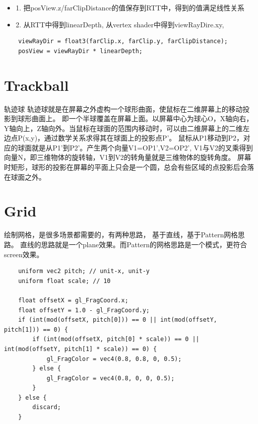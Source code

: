 \begin{itemize}
    \item {1. 把posView.z/farClipDistance的值保存到RTT中，得到的值满足线性关系}
    \item {2. 从RTT中得到linearDepth, 从vertex shader中得到viewRayDire.xy, }
\end{itemize}

\begin{lstlisting}
    viewRayDir = float3(farClip.x, farClip.y, farClipDistance);
    posView = viewRayDir * linearDepth;
\end{lstlisting}

\section{Trackball}
轨迹球\cite{Trackball}
轨迹球就是在屏幕之外虚构一个球形曲面，使鼠标在二维屏幕上的移动投影到球形曲面上。
即一个半球覆盖在屏幕上面。以屏幕中心为球心O，X轴向右，Y轴向上，Z轴向外。当鼠标在球面的范围内移动时，可以由二维屏幕上的二维左边点P(x,y)，通过数学关系求得其在球面上的投影点P'。
鼠标从P1移动到P2，对应的球面就是从P1'到P2'。产生两个向量V1=OP1',V2=OP2',  
V1与V2的叉乘得到向量N，即三维物体的旋转轴，V1到V2的转角量就是三维物体的旋转角度。
屏幕时矩形，球形的投影在屏幕的平面上只会是一个圆，总会有些区域的点投影后会落在球面之外。

\section{Grid}
绘制网格，是很多场景都需要的，有两种思路， 基于直线，基于Pattern网格思路。
直线的思路就是一个plane效果。而Pattern的网格思路是一个模式，更符合screen效果。
\begin{lstlisting}
    uniform vec2 pitch; // unit-x, unit-y
    uniform float scale; // 10

    float offsetX = gl_FragCoord.x;
    float offsetY = 1.0 - gl_FragCoord.y;
    if (int(mod(offsetX, pitch[0])) == 0 || int(mod(offsetY, pitch[1])) == 0) {
        if (int(mod(offsetX, pitch[0] * scale)) == 0 || int(mod(offsetY, pitch[1] * scale)) == 0) {
            gl_FragColor = vec4(0.8, 0.8, 0, 0.5);
        } else {
            gl_FragColor = vec4(0.8, 0, 0, 0.5);
        }
    } else {
        discard;
    }
\end{lstlisting}

